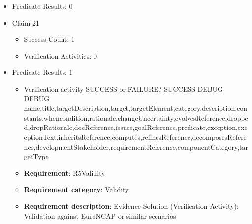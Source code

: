 \documentclass{article}
\begin{document}
\begin{itemize}
\begin{itemize}
					\item Verification activity SUCCESS or FAILURE? SUCCESS
					\item \textbf{Claim Weight}: 0
						\item \textbf{Requirement}: R4FeatureCalcTTC 
						\item \textbf{Requirement category}: FunctionsCoverage 
						\item \textbf{Requirement description}: Evidence Solution (Verification Activity): Check the features and subsystems covered by the model  To stop the vehicle if TTC is equal to MinTTC
					
					\item Verification activity SUCCESS or FAILURE? SUCCESS
					\item \textbf{Claim Weight}: 0
						\item \textbf{Requirement}: R4FeatureCalcTTC 
						\item \textbf{Requirement category}: FunctionsCoverage 
						\item \textbf{Requirement description}: Evidence Solution (Verification Activity): Check the features and subsystems covered by the model  To stop the vehicle if TTC is equal to MinTTC
					
				\end{itemize}
				
									    
				\item Predicate Results: 0

  				  \item Claim 21
				\begin{itemize}
			    	\item Success Count: 1 
			    	\item Verification Activities: 0
				\end{itemize}
				
									    
				\item Predicate Results: 1
					\begin{itemize}				
					\item Verification activity SUCCESS or FAILURE? SUCCESS
					DEBUG DEBUG name,title,targetDescription,target,targetElement,category,description,constants,whencondition,rationale,changeUncertainty,evolvesReference,dropped,dropRationale,docReference,issues,goalReference,predicate,exception,exceptionText,inheritsReference,computes,refinesReference,decomposesReference,developmentStakeholder,requirementReference,componentCategory,targetType
					\item \textbf{Requirement}: R5Validity 
					\item \textbf{Requirement category}: Validity
					\item \textbf{Requirement description}: Evidence Solution (Verification Activity): Validation against EuroNCAP or similar scenarios
					\end{itemize}


\end{itemize}
\end{document}
